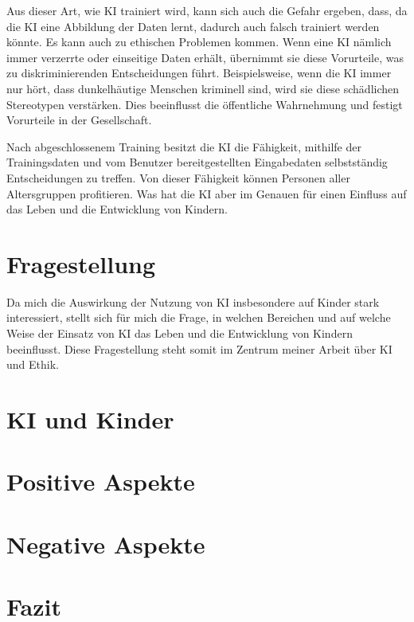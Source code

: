 \documentclass{article}
\begin{document}
Aus dieser Art, wie KI trainiert wird, kann sich auch die Gefahr ergeben, dass, da die KI eine Abbildung der Daten lernt, dadurch auch falsch trainiert werden könnte. Es kann auch zu ethischen Problemen kommen.
Wenn eine KI nämlich immer verzerrte oder einseitige Daten erhält, übernimmt sie diese Vorurteile, was zu diskriminierenden Entscheidungen führt. Beispielsweise, wenn die KI immer nur hört, dass dunkelhäutige Menschen kriminell sind, wird sie diese schädlichen Stereotypen verstärken. Dies beeinflusst die öffentliche Wahrnehmung und festigt Vorurteile in der Gesellschaft.

Nach abgeschlossenem Training besitzt die KI die Fähigkeit, mithilfe der Trainingsdaten und vom Benutzer bereitgestellten Eingabedaten selbstständig Entscheidungen zu treffen. Von dieser Fähigkeit können Personen aller Altersgruppen profitieren. Was hat die KI aber im Genauen für einen Einfluss auf das Leben und die Entwicklung von Kindern.

\section{Fragestellung}

Da mich die Auswirkung der Nutzung von KI insbesondere auf Kinder stark interessiert, stellt sich für mich die Frage, in welchen Bereichen und auf welche Weise der Einsatz von KI das Leben und die Entwicklung von Kindern beeinflusst. Diese Fragestellung steht somit im Zentrum meiner Arbeit über KI und Ethik.

\section{KI und Kinder}


\section{Positive Aspekte}


\section{Negative Aspekte}


\section{Fazit}




\printbibliography
\end{document}
